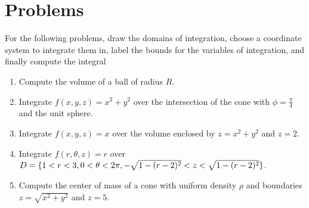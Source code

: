 \documentclass[letterpaper,11pt]{article}
\begin{document}
\section*{Problems}
For the following problems, draw the domains of integration, choose a coordinate system to integrate them in,
label the bounds for the variables of integration, and finally compute the integral
\begin{enumerate}
\item Compute the volume of a ball of radius $R$.\\
  \newline
  \newline
  \newline
  \newline
  \newline
  \newline
  \newline
\item Integrate $f(x, y, z) = x^2 + y^2$ over the intersection of the cone with $\phi = \frac{\pi}{4}$ and the unit sphere.\\
  \newline
  \newline
  \newline
  \newline
  \newline
  \newline
  \newline
\item Integrate $f(x, y, z) = x$ over the volume enclosed by $z = x^2 + y^2$ and $z = 2$.\\
  \newline
  \newline
  \newline
  \newline
  \newline
  \newline
  \newline
  \newline
\item Integrate $f(r, \theta, z) = r$ over $D = \{ 1 < r < 3, 0 < \theta < 2 \pi, -\sqrt{1 - (r - 2)^2} < z < \sqrt{1 - (r - 2)^2} \}$.\\
  \newpage
\item Compute the center of mass of a cone with uniform density $\rho$ and boundaries $z = \sqrt{x^2 + y^2}$ and $z = 5$.\\
  \newline
  \newline
  \newline

\end{enumerate}
\end{document}
